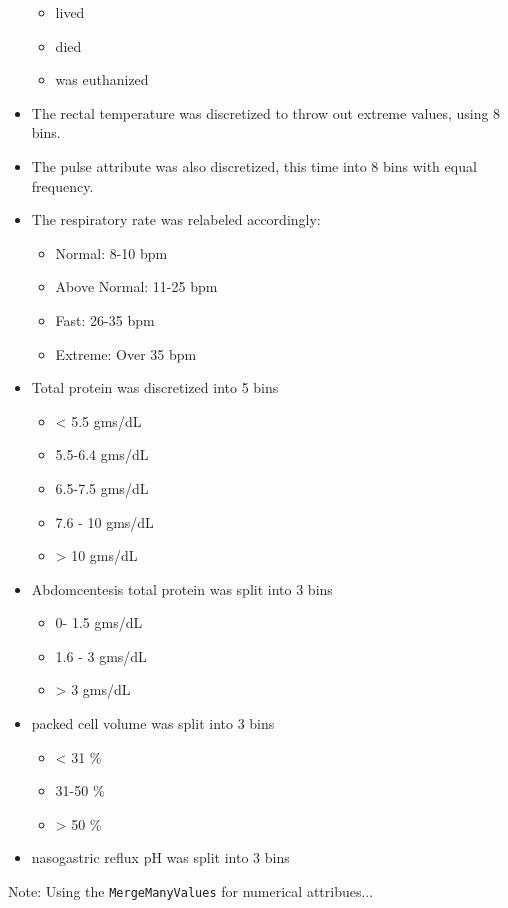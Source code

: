 \begin{itemize}

\begin{itemize}
\item lived
\item died
\item was euthanized
\end{itemize}

\item The rectal temperature was discretized to throw out extreme values, using 8 bins.

\item The pulse attribute was also discretized, this time into 8 bins with equal frequency.

\item The respiratory rate was relabeled accordingly:
\begin{itemize}
\item Normal: 8-10 bpm
\item Above Normal: 11-25 bpm
\item Fast: 26-35 bpm
\item Extreme: Over 35 bpm
\end{itemize}

\item Total protein was discretized into 5 bins
\begin{itemize}
\item < 5.5 gms/dL
\item 5.5-6.4 gms/dL
\item 6.5-7.5 gms/dL
\item 7.6 - 10 gms/dL
\item > 10 gms/dL
\end{itemize}


\item Abdomcentesis total protein was split into 3 bins
\begin{itemize}
\item 0- 1.5 gms/dL
\item 1.6 - 3 gms/dL
\item > 3 gms/dL
\end{itemize}

\item packed cell volume was split into 3 bins
\begin{itemize}
\item < 31 \%
\item 31-50 \%
\item > 50 \%
\end{itemize}

\item nasogastric reflux pH was split into 3 bins


\end{itemize}

Note: Using the \verb|MergeManyValues| for numerical attribues...
